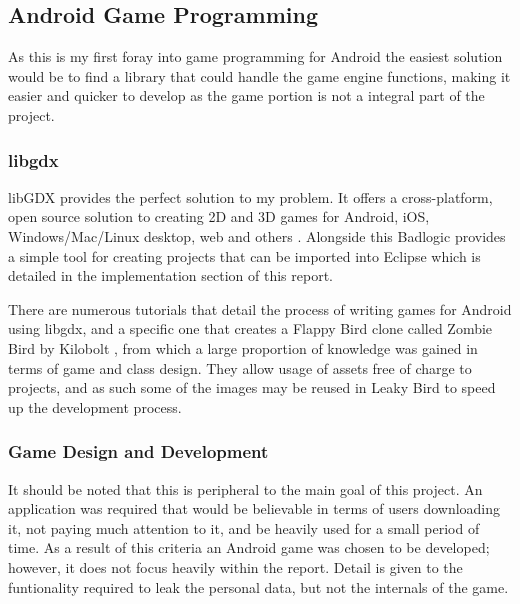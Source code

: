 \subsection{Android Game Programming}
As this is my first foray into game programming for Android the easiest solution would be to find a library that could handle the game engine functions, making it easier and quicker to develop as the game portion is not a integral part of the project.

\subsubsection{libgdx}
libGDX provides the perfect solution to my problem. It offers a cross-platform, open source solution to creating 2D and 3D games for Android, iOS, Windows/Mac/Linux desktop, web and others \cite{research:badlogix}. Alongside this Badlogic provides a simple tool for creating projects that can be imported into Eclipse which is detailed in the implementation section of this report.

There are numerous tutorials that detail the process of writing games for Android using libgdx, and a specific one that creates a Flappy Bird \cite{research:flappy_guardian} clone called Zombie Bird by Kilobolt \cite{research:kilo_tut}, from which a large proportion of knowledge was gained in terms of game and class design. They allow usage of assets free of charge to projects, and as such some of the images may be reused in Leaky Bird to speed up the development process.

\subsubsection{Game Design and Development}

It should be noted that this is peripheral to the main goal of this project. An application was required that would be believable in terms of users downloading it, not paying much attention to it, and be heavily used for a small period of time. As a result of this criteria an Android game was chosen to be developed; however, it does not focus heavily within the report. Detail is given to the funtionality required to leak the personal data, but not the internals of the game.